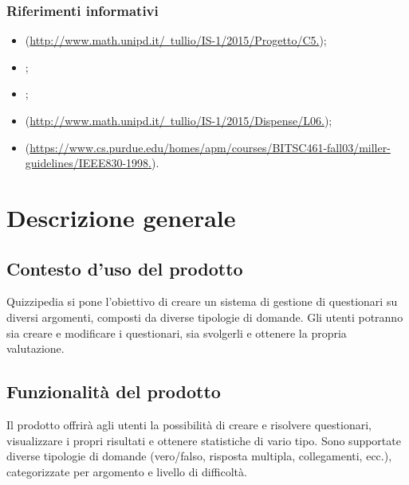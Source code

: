 \documentclass[a4paper, titlepage]{article}
\begin{document}
\subsubsection{Riferimenti informativi}
\begin{itemize}
\item {}  (\href{http://www.math.unipd.it/~tullio/IS-1/2015/Progetto/C5.\gl{pdf}}{http://www.math.unipd.it/~tullio/IS-1/2015/Progetto/C5.});

\item {} \SdFdoc;

\item {} \Gldoc;

\item {}  (\href{http://www.math.unipd.it/~tullio/IS-1/2015/Dispense/L06.\gl{pdf}}{http://www.math.unipd.it/~tullio/IS-1/2015/Dispense/L06.});

\item {}  (\href{https://www.cs.purdue.edu/homes/apm/courses/BITSC461-fall03/miller-guidelines/IEEE830-1998.\gl{html}}{https://www.cs.purdue.edu/homes/apm/courses/BITSC461-fall03/miller-guidelines/IEEE830-1998.}).

\end{itemize}

\newpage

\section{Descrizione generale}
\subsection{Contesto d'uso del prodotto}
Quizzipedia si pone l'obiettivo di creare un sistema di gestione di questionari su diversi argomenti, composti da diverse tipologie di domande. Gli utenti potranno sia creare e modificare i questionari, sia svolgerli e ottenere la propria valutazione.

\subsection{Funzionalità del prodotto}
Il prodotto offrirà agli utenti la possibilità di creare e risolvere questionari, visualizzare i propri risultati e ottenere statistiche di vario tipo. 
Sono supportate diverse tipologie di domande (vero/falso, risposta multipla, collegamenti, ecc.), categorizzate per argomento e livello di difficoltà. 
\end{document}
